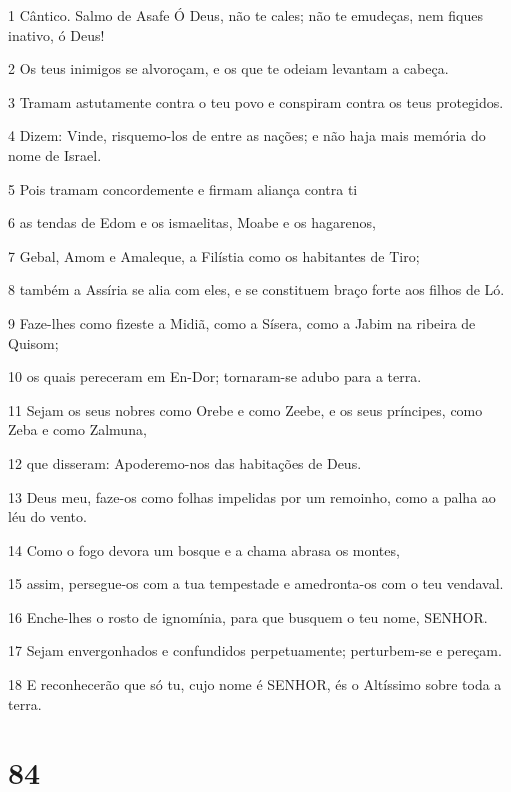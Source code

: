 \par 1 Cântico. Salmo de Asafe Ó Deus, não te cales; não te emudeças, nem fiques inativo, ó Deus!
\par 2 Os teus inimigos se alvoroçam, e os que te odeiam levantam a cabeça.
\par 3 Tramam astutamente contra o teu povo e conspiram contra os teus protegidos.
\par 4 Dizem: Vinde, risquemo-los de entre as nações; e não haja mais memória do nome de Israel.
\par 5 Pois tramam concordemente e firmam aliança contra ti
\par 6 as tendas de Edom e os ismaelitas, Moabe e os hagarenos,
\par 7 Gebal, Amom e Amaleque, a Filístia como os habitantes de Tiro;
\par 8 também a Assíria se alia com eles, e se constituem braço forte aos filhos de Ló.
\par 9 Faze-lhes como fizeste a Midiã, como a Sísera, como a Jabim na ribeira de Quisom;
\par 10 os quais pereceram em En-Dor; tornaram-se adubo para a terra.
\par 11 Sejam os seus nobres como Orebe e como Zeebe, e os seus príncipes, como Zeba e como Zalmuna,
\par 12 que disseram: Apoderemo-nos das habitações de Deus.
\par 13 Deus meu, faze-os como folhas impelidas por um remoinho, como a palha ao léu do vento.
\par 14 Como o fogo devora um bosque e a chama abrasa os montes,
\par 15 assim, persegue-os com a tua tempestade e amedronta-os com o teu vendaval.
\par 16 Enche-lhes o rosto de ignomínia, para que busquem o teu nome, SENHOR.
\par 17 Sejam envergonhados e confundidos perpetuamente; perturbem-se e pereçam.
\par 18 E reconhecerão que só tu, cujo nome é SENHOR, és o Altíssimo sobre toda a terra.

\chapter{84}

